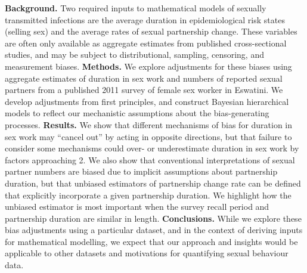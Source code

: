 \textbf{Background.}
Two required inputs to mathematical models of sexually transmitted infections are
the average duration in epidemiological risk states (\eg selling sex) and
the average rates of sexual partnership change.
These variables are often only available as aggregate estimates from
published cross-sectional studies, and may be subject to
distributional, sampling, censoring, and measurement biases.
\textbf{Methods.}
We explore adjustments for these biases using aggregate estimates of
duration in sex work and numbers of reported sexual partners
from a published 2011 survey of female sex worker in Eswatini.
We develop adjustments from first principles,
and construct Bayesian hierarchical models to reflect
our mechanistic assumptions about the bias-generating processes.
\textbf{Results.}
We show that different mechanisms of bias for duration in sex work may
``cancel out'' by acting in opposite directions,
but that failure to consider some mechanisms could over- or underestimate
duration in sex work by factors approaching 2.
We also show that conventional interpretations of sexual partner numbers
are biased due to implicit assumptions about partnership duration,
but that unbiased estimators of partnership change rate can be defined
that explicitly incorporate a given partnership duration.
We highlight how the unbiased estimator is most important when
the survey recall period and partnership duration are similar in length.
\textbf{Conclusions.}
While we explore these bias adjustments using a particular dataset,
and in the context of deriving inputs for mathematical modelling,
we expect that our approach and insights would be applicable to
other datasets and motivations for quantifying sexual behaviour data.
